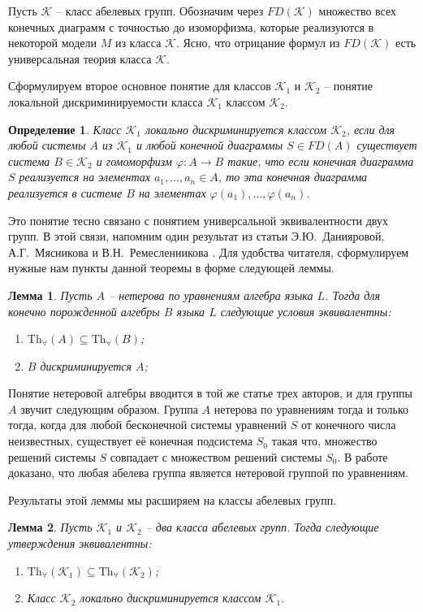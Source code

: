 \documentclass[a4paper,11pt,twoside]{article}
\newtheorem{lemma}{Лемма}[section]
\newtheorem{definition}{Определение}[section]
\def\K{{\mathcal{K}}}
\def\Tha{{\mathrm{Th}_\forall}}
\begin{document}
Пусть $\K$ -- класс абелевых групп. Обозначим через $FD(\K)$ множество всех конечных диаграмм с точностью до изоморфизма, которые реализуются в некоторой модели $M$ из класса $\K$. Ясно, что отрицание формул из $FD(\K)$ есть универсальная теория класса $\K$.

Сформулируем второе основное понятие для классов $\K_1$ и $\K_2$ -- понятие локальной дискриминируемости класса $\K_1$ классом $\K_2$.
\begin{definition}
Класс $\K_1$ локально дискриминируется классом $\K_2$, если для любой системы $A$ из $\K_1$ и любой конечной диаграммы $S \in FD(A)$ существует система $B \in \K_2$ и гомоморфизм $\varphi: A \rightarrow B$ такие, что если конечная диаграмма $S$ реализуется на элементах $a_1, \ldots, a_n \in A$, то эта конечная диаграмма реализуется в системе $B$ на элементах $\varphi(a_1), \ldots, \varphi(a_n)$.
\end{definition}

Это понятие тесно связано с понятием универсальной эквивалентности двух групп. В этой связи, напомним один результат из статьи Э.Ю.~Данияровой, А.Г.~Мясникова и В.Н.~Ремесленникова \cite{DMR1}. Для удобства читателя, сформулируем нужные нам пункты данной теоремы в форме следующей леммы.

\begin{lemma}\label{lemma:UnivEquiv}
Пусть $A$ -- нетерова по уравнениям алгебра языка $L$. Тогда для конечно порожденной алгебры $B$ языка $L$ следующие условия эквивалентны:
\begin{enumerate}
\item $\mathrm{Th}_{\forall}(A) \subseteq \mathrm{Th}_{\forall}(B)$;
\item $B$ дискриминируется $A$;
\end{enumerate}
\end{lemma}

Понятие нетеровой алгебры вводится в той же статье трех авторов, и для группы $A$ звучит следующим образом. Группа $A$ нетерова по уравнениям тогда и только тогда, когда для любой бесконечной системы уравнений $S$ от конечного числа неизвестных, существует её конечная подсистема $S_0$ такая что, множество решений системы $S$ совпадает с множеством решений системы $S_0$. В работе \cite{DMR2} доказано, что любая абелева группа является нетеровой группой по уравнениям.

Результаты этой леммы мы расширяем на классы абелевых групп.

\begin{lemma}\label{lemma:UnivEquivForClass}
Пусть $\K_1$ и $\K_2$ -- два класса абелевых групп. Тогда следующие утверждения эквивалентны:
\begin{enumerate}
\item $\Tha(\K_1) \subseteq \Tha(\K_2)$;
\item Класс $\K_2$ локально дискриминируется классом $\K_1$.
\end{enumerate}
\end{lemma}
\end{document}
